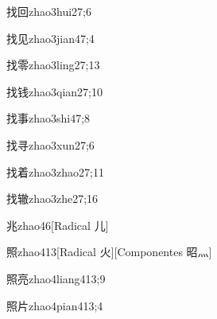 \begin{verbete}{找回}{zhao3hui2}{7;6}
\end{verbete}

\begin{verbete}{找见}{zhao3jian4}{7;4}
\end{verbete}

\begin{verbete}{找零}{zhao3ling2}{7;13}
\end{verbete}

\begin{verbete}{找钱}{zhao3qian2}{7;10}
\end{verbete}

\begin{verbete}{找事}{zhao3shi4}{7;8}
\end{verbete}

\begin{verbete}{找寻}{zhao3xun2}{7;6}
\end{verbete}

\begin{verbete}{找着}{zhao3zhao2}{7;11}
\end{verbete}

\begin{verbete}{找辙}{zhao3zhe2}{7;16}
\end{verbete}

\begin{verbete}{兆}{zhao4}{6}[Radical 儿]
\end{verbete}

\begin{verbete}{照}{zhao4}{13}[Radical 火][Componentes 昭灬]
\end{verbete}

\begin{verbete}{照亮}{zhao4liang4}{13;9}
\end{verbete}

\begin{verbete}{照片}{zhao4pian4}{13;4}
\end{verbete}

